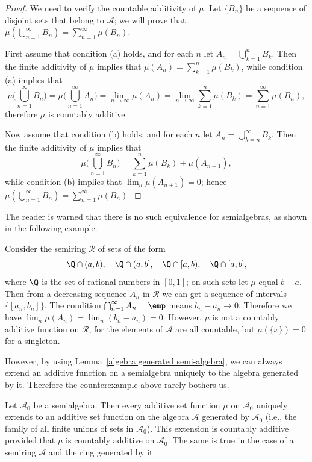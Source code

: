 \begin{proof}
We need to verify the countable additivity of $\mu$. Let $\{B_n\}$ be a sequence of disjoint sets that belong to $\mathcal{A}$; we will prove that $\mu(\bigcup_{n=1}^{\infty}B_n)=\sum_{n=1}^{\infty}\mu(B_n)$.\par
First assume that condition (a) holds, and for each $n$ let $A_n=\bigcup_{k=1}^{n}B_k$. Then the finite additivity of $\mu$ implies that $\mu(A_n)=\sum_{k=1}^{n}\mu(B_k)$, while condition (a) implies that 
\[\mu\Big(\bigcup_{n=1}^{\infty}B_n\Big)=\mu\Big(\bigcup_{n=1}^{\infty}A_n\Big)=\lim_{n\to\infty}\mu(A_n)=\lim_{n\to\infty}\sum_{k=1}^{n}\mu(B_k)=\sum_{n=1}^{\infty}\mu(B_n),\]
therefore $\mu$ is countably additive.\par
Now assume that condition (b) holds, and for each $n$ let $A_n=\bigcup_{k=n}^{\infty}B_k$. Then the finite additivity of $\mu$ implies that
\[\mu\Big(\bigcup_{n=1}^{\infty}B_n\Big)=\sum_{k=1}^{n}\mu(B_k)+\mu(A_{n+1}),\]
while condition (b) implies that $\lim_n\mu(A_{n+1})=0$; hence $\mu(\bigcup_{n=1}^{\infty}B_n)=\sum_{n=1}^{\infty}\mu(B_n)$.
\end{proof}
The reader is warned that there is no such equivalence for semialgebras, as shown in the following example.
\begin{example}
Consider the semiring $\mathcal{R}$ of sets of the form 
\[\Q\cap(a,b),\quad\Q\cap(a,b],\quad\Q\cap[a,b),\quad\Q\cap[a,b],\]
where $\Q$ is the set of rational numbers in $[0,1]$; on such sets let $\mu$ equal $b-a$. Then from a decreasing sequence $A_n$ in $\mathcal{R}$ we can get a sequence of intervals $\{[a_n,b_n]\}$. The condition $\bigcap_{n=1}^{\infty}A_n=\emp$ means $b_n-a_n\to 0$. Therefore we have $\lim_n\mu(A_n)=\lim_n(b_n-a_n)=0$. However, $\mu$ is not a countably additive function on $\mathcal{R}$, for the elements of $\mathcal{A}$ are all countable, but $\mu(\{x\})=0$ for a singleton.
\end{example}
However, by using Lemma~\ref{algebra generated semi-algebra}, we can always extend an additive function on a semialgebra uniquely to the algebra generated by it. Therefore the counterexample above rarely bothers us.
\begin{proposition}
Let $\mathcal{A}_0$ be a semialgebra. Then every additive set function $\mu$ on $\mathcal{A}_0$ uniquely extends to an additive set function on the algebra $\mathcal{A}$ generated by $\mathcal{A}_0$ (i.e., the family of all finite unions of sets in $\mathcal{A}_0$). This extension is countably additive provided that $\mu$ is countably additive on $\mathcal{A}_0$. The same is true in the case of a semiring $\mathcal{A}$ and the ring generated by it.
\end{proposition}
